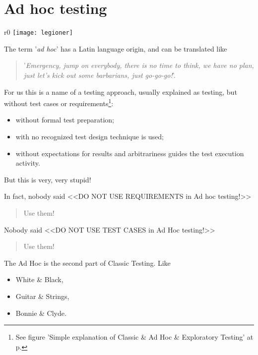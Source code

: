 \section{Ad hoc testing}
\label{sec:Ad hoc testing}


\begin{wrapfigure}{r}{0\linewidth}
\texttt{[image: legioner]} %
\caption{}
\label{ris:legioner}
\end{wrapfigure}

The term '\emph{ad hoc}' has a Latin language origin, and can be translated like \begin{quote}
'\textit{Emergency, jump on everybody, there is no time to think, we have no plan, just let's kick out some barbarians, just go-go-go!}'.                                                                                                                                                                                                           \end{quote} 

For us this is a name of a testing approach, usually explained as testing, but without test cases or requirements\footnote{See figure 'Simple explanation of Classic \& Ad Hoc \& Exploratory Testing' at p.\pageref{fig:ClassicAdHocExploratoryTesting}}:

\begin{itemize}
\item without formal test preparation;
\item with no recognized test design technique is used;
\item without expectations for results and arbitrariness guides the test execution activity. 
\end{itemize}

But this is very, very stupid!

In fact, nobody said <<DO NOT USE REQUIREMENTS in Ad hoc testing!>> 
\begin{quote}
Use them!
\end{quote} 

Nobody said <<DO NOT USE TEST CASES in Ad Hoc testing!>>
\begin{quote}
Use them!
\end{quote} 

The Ad Hoc is the second part of Classic Testing. Like 
\begin{itemize}
\item 
White \& Black, 
\item 
Guitar \& Strings, 
\item 
Bonnie \& Clyde.
\end{itemize}

